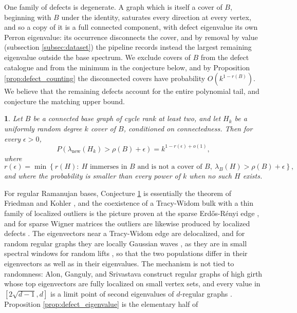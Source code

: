\documentclass[12pt,oneside,english]{amsart}
\numberwithin{equation}{section}
\numberwithin{figure}{section}
\numberwithin{table}{section}
\theoremstyle{plain}
\numberwithin{thm}{section}
\theoremstyle{plain}
\theoremstyle{plain}
\theoremstyle{plain}
\newtheorem{conjecture}[thm]{\protect\conjecturename}
\theoremstyle{definition}
\theoremstyle{definition}
\theoremstyle{definition}
\theoremstyle{remark}
\providecommand{\conjecturename}{Conjecture}
\begin{document}
One family of defects is degenerate. A graph which is itself a cover
of $B$, beginning with $B$ under the identity, saturates every direction
at every vertex, and so a copy of it is a full connected component,
with defect eigenvalue its own Perron eigenvalue: its occurrence disconnects
the cover, and by removal by value (subsection \ref{subsec:dataset})
the pipeline records instead the largest remaining eigenvalue outside
the base spectrum. We exclude covers of $B$ from the defect catalogue
and from the minimum in the conjecture below, and by Proposition \ref{prop:defect_counting}
the disconnected covers have probability $O(k^{1-r(B)})$. We believe
that the remaining defects account for the entire polynomial tail,
and conjecture the matching upper bound.
\begin{conjecture}
\label{conj:defect_completeness}Let $B$ be a connected base graph
of cycle rank at least two, and let $H_{k}$ be a uniformly random
degree $k$ cover of $B$, conditioned on connectedness. Then for every
$\epsilon>0$,
\[
P\left(\lambda_{\mathrm{new}}(H_{k})>\rho(B)+\epsilon\right)=k^{1-r(\epsilon)+o(1)},
\]
where
\[
r(\epsilon)=\min\left\{ r(H):\ H\text{ immerses in }B\text{ and is not a cover of }B,\ \lambda_{B}(H)>\rho(B)+\epsilon\right\} ,
\]
and where the probability is smaller than every power of $k$ when
no such $H$ exists.
\end{conjecture}
For regular Ramanujan bases, Conjecture \ref{conj:defect_completeness}
is essentially the theorem of Friedman and Kohler \cite{FriedmanKohler2014,FriedmanKohler2019},
and the coexistence of a Tracy-Widom bulk with a thin family of localized
outliers is the picture proven at the sparse Erd\H{o}s-R\'{e}nyi edge
\cite{AltDucatezKnowles2021,AltDucatezKnowles2023,AltDucatezKnowles2024,HiesmayrMcKenzie2025},
and for sparse Wigner matrices the outliers are likewise produced
by localized defects \cite{TikhomirovYoussef2021}. The eigenvectors
near a Tracy-Widom edge are delocalized, and for random regular graphs
they are locally Gaussian waves \cite{HeHuangYau2025}, as they are
in small spectral windows for random lifts \cite{DemboMcKenzie2026},
so that the two populations differ in their eigenvectors as well as
in their eigenvalues. The mechanism is not tied to randomness: Alon,
Ganguly, and Srivastava \cite{AlonGangulySrivastava2021} construct
regular graphs of high girth whose top eigenvectors are fully localized
on small vertex sets, and every value in $[2\sqrt{d-1},d]$ is a limit
point of second eigenvalues of $d$-regular graphs \cite{AlonWei2023,DongMcKenzie2026}.
Proposition \ref{prop:defect_eigenvalue} is the elementary half of
\end{document}
